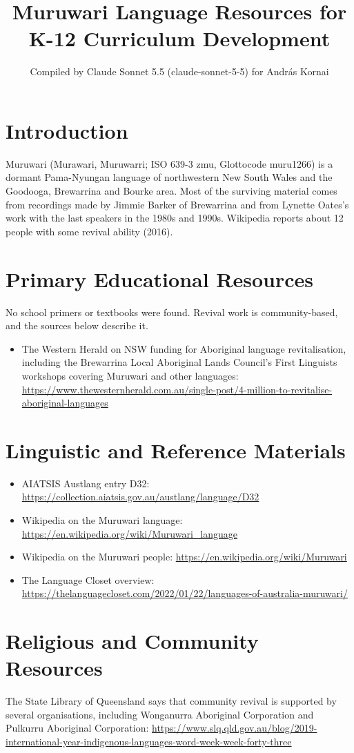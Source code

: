 \documentclass[12pt]{article}
\title{Muruwari Language Resources for K-12 Curriculum Development}
\author{Compiled by Claude Sonnet 5.5 (claude-sonnet-5-5) for Andr\'as Kornai}
\date{}
\begin{document}
\maketitle

\section{Introduction}
Muruwari (Murawari, Muruwarri; ISO 639-3 zmu, Glottocode muru1266) is a dormant Pama-Nyungan language of northwestern New South Wales and the Goodooga, Brewarrina and Bourke area. Most of the surviving material comes from recordings made by Jimmie Barker of Brewarrina and from Lynette Oates's work with the last speakers in the 1980s and 1990s. Wikipedia reports about 12 people with some revival ability (2016).

\section{Primary Educational Resources}
No school primers or textbooks were found. Revival work is community-based, and the sources below describe it.
\begin{itemize}
\item The Western Herald on NSW funding for Aboriginal language revitalisation, including the Brewarrina Local Aboriginal Lands Council's First Linguists workshops covering Muruwari and other languages: \url{https://www.thewesternherald.com.au/single-post/4-million-to-revitalise-aboriginal-languages}
\end{itemize}

\section{Linguistic and Reference Materials}
\begin{itemize}
\item AIATSIS Austlang entry D32: \url{https://collection.aiatsis.gov.au/austlang/language/D32}
\item Wikipedia on the Muruwari language: \url{https://en.wikipedia.org/wiki/Muruwari_language}
\item Wikipedia on the Muruwari people: \url{https://en.wikipedia.org/wiki/Muruwari}
\item The Language Closet overview: \url{https://thelanguagecloset.com/2022/01/22/languages-of-australia-muruwari/}
\end{itemize}

\section{Religious and Community Resources}
The State Library of Queensland says that community revival is supported by several organisations, including Wonganurra Aboriginal Corporation and Pulkurru Aboriginal Corporation: \url{https://www.slq.qld.gov.au/blog/2019-international-year-indigenous-languages-word-week-week-forty-three}
\end{document}
